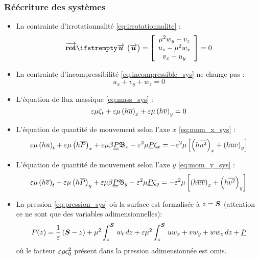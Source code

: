 \subsubsection{Réécriture des systèmes}
\begin{itemize}[label=$\mybullet$]
	\item La contrainte d'irrotationnalité \eqref{eq:irrotationnalite} :
	\begin{equation}
		\rot[\velocity] = \myvector{\mu^2 w_y - v_z}{u_z-\mu^2w_x}{v_x-u_y} = 0
	\end{equation}
	\item La contrainte d'incompressibilité \eqref{eq:incompressible_sys} ne change pas :
	\begin{equation*}
		u_x + v_y + w_z = 0
	\end{equation*}
	\item L'équation de flux massique \eqref{eq:mass_sys} :
	\begin{equation}
		 \varepsilon\mu\zeta_t + \varepsilon\mu\left(h \overline{u}\right)_x + \varepsilon\mu\left(h \overline{v}\right)_y = 0
	\end{equation}
	\item L'équation de quantité de mouvement selon l'axe $x$ \eqref{eq:mom_x_sys} :
	\begin{equation}
		\varepsilon\mu\left(h\overline{u}\right)_t + \varepsilon\mu\left(h\overline{P}\right)_x +\varepsilon\mu\beta\underline{\underline{P}}\mathfrak{B}_x - \varepsilon^2\mu\underline{P}\zeta_x  =- \varepsilon^2\mu\left[\left(h\overline{u^2}\right)_x + \left(h\overline{uv}\right)_y\right]\label{eq:mom_x_ad}
	\end{equation}
		\item L'équation de quantité de mouvement selon l'axe $y$ \eqref{eq:mom_y_sys} :
		\begin{equation}
			\varepsilon\mu\left(h\overline{v}\right)_t + \varepsilon\mu\left(h\overline{P}\right)_y +\varepsilon\mu\beta\underline{\underline{P}}\mathfrak{B}_y - \varepsilon^2\mu\underline{P}\zeta_y =- \varepsilon^2\mu\left[\left(h\overline{uv}\right)_x + \left(h\overline{v^2}\right)_y\right]\label{eq:mom_y_ad}
		\end{equation}
	\item La pression \eqref{eq:pression_sys} où la surface est formalisée à $z=\boldsymbol{S}$ (attention ce ne sont que des variables adimensionnelles):
	\begin{equation}
		P(z) = \frac{1}{\varepsilon}\left(\boldsymbol{S} - z\right) + \mu^2\int_{z}^{\boldsymbol{S}}\,w_t\,dz + \varepsilon\mu^2\int_{z}^{\boldsymbol{S}}\,uw_x + vw_y + ww_z\,dz  +\underline{P}
	\end{equation}
	où le facteur $\varepsilon\rho c_0^2$ présent dans la pression adimensionnée est omis.
\end{itemize}

